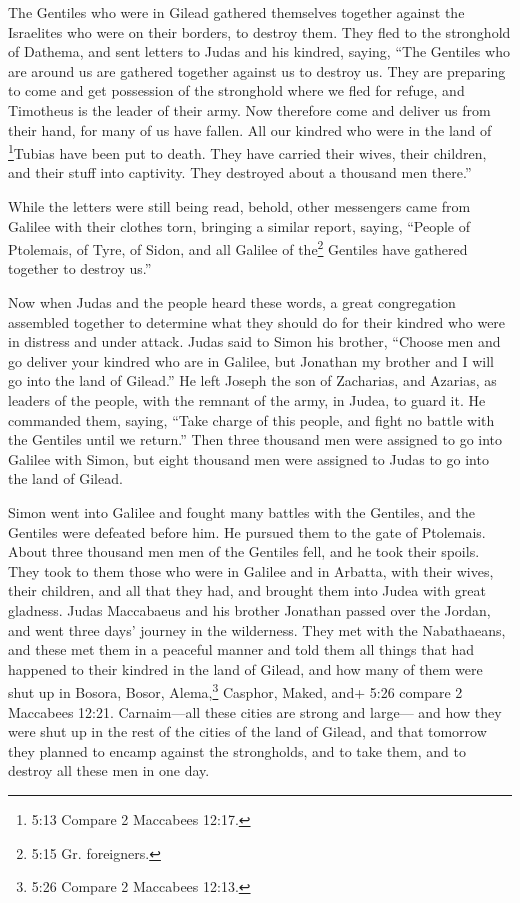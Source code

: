  The Gentiles who were in Gilead gathered themselves
together against the Israelites who were on their borders, to destroy
them. They fled to the stronghold of Dathema,  and sent
letters to Judas and his kindred, saying, ``The Gentiles who are around
us are gathered together against us to destroy us.  They
are preparing to come and get possession of the stronghold where we fled
for refuge, and Timotheus is the leader of their army.  Now
therefore come and deliver us from their hand, for many of us have
fallen.  All our kindred who were in the land of
\footnote{5:13 Compare 2 Maccabees 12:17.}Tubias have been put to death.
They have carried their wives, their children, and their stuff into
captivity. They destroyed about a thousand men there.''

 While the letters were still being read, behold, other
messengers came from Galilee with their clothes torn, bringing a similar
report,  saying, ``People of Ptolemais, of Tyre, of Sidon,
and all Galilee of the\footnote{5:15 Gr. foreigners.} Gentiles have
gathered together to destroy us.''

 Now when Judas and the people heard these words, a great
congregation assembled together to determine what they should do for
their kindred who were in distress and under attack.  Judas
said to Simon his brother, ``Choose men and go deliver your kindred who
are in Galilee, but Jonathan my brother and I will go into the land of
Gilead.''  He left Joseph the son of Zacharias, and
Azarias, as leaders of the people, with the remnant of the army, in
Judea, to guard it.  He commanded them, saying, ``Take
charge of this people, and fight no battle with the Gentiles until we
return.''  Then three thousand men were assigned to go into
Galilee with Simon, but eight thousand men were assigned to Judas to go
into the land of Gilead.

 Simon went into Galilee and fought many battles with the
Gentiles, and the Gentiles were defeated before him.  He
pursued them to the gate of Ptolemais. About three thousand men men of
the Gentiles fell, and he took their spoils.  They took to
them those who were in Galilee and in Arbatta, with their wives, their
children, and all that they had, and brought them into Judea with great
gladness.  Judas Maccabaeus and his brother Jonathan passed
over the Jordan, and went three days' journey in the wilderness.
 They met with the Nabathaeans, and these met them in a
peaceful manner and told them all things that had happened to their
kindred in the land of Gilead,  and how many of them were
shut up in Bosora, Bosor, Alema,\footnote{5:26 Compare 2 Maccabees
  12:13.} Casphor, Maked, and+ 5:26 compare 2 Maccabees 12:21.
Carnaim---all these cities are strong and large---  and how
they were shut up in the rest of the cities of the land of Gilead, and
that tomorrow they planned to encamp against the strongholds, and to
take them, and to destroy all these men in one day.

